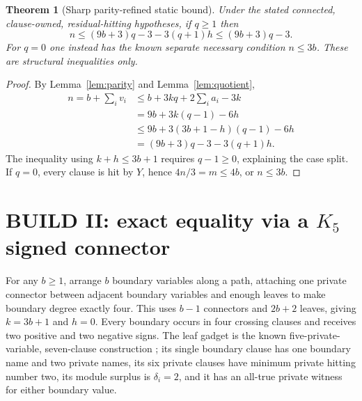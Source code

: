 \documentclass[11pt]{article}
\newtheorem{theorem}{Theorem}
\begin{document}
\begin{theorem}[Sharp parity-refined static bound]\label{th:bound}
Under the stated connected, clause-owned, residual-hitting hypotheses, if $q\ge1$ then
\begin{equation}\label{eq:newbound}
 \boxed{n\le(9b+3)q-3-3(q+1)h\le(9b+3)q-3.}
\end{equation}
For $q=0$ one instead has the known separate necessary condition $n\le3b$. These are \emph{structural} inequalities only.
\end{theorem}
\begin{proof}
By Lemma~\ref{lem:parity} and Lemma~\ref{lem:quotient},
\begin{align*}
 n=b+\sum_i v_i&\le b+3kq+2\sum_i a_i-3k\\
 &=9b+3k(q-1)-6h\\
 &\le9b+3(3b+1-h)(q-1)-6h\\
 &=(9b+3)q-3-3(q+1)h.
\end{align*}
The inequality using $k+h\le3b+1$ requires $q-1\ge0$, explaining the case split. If $q=0$, every clause is hit by $Y$, hence $4n/3=m\le4b$, or $n\le3b$.
\end{proof}

\section{BUILD II: exact equality via a $K_5$ signed connector}
For any $b\ge1$, arrange $b$ boundary variables along a path, attaching one private connector between adjacent boundary variables and enough leaves to make boundary degree exactly four. This uses $b-1$ connectors and $2b+2$ leaves, giving $k=3b+1$ and $h=0$. Every boundary occurs in four crossing clauses and receives two positive and two negative signs. The leaf gadget is the known five-private-variable, seven-clause construction \cite{component}; its single boundary clause has one boundary name and two private names, its six private clauses have minimum private hitting number two, its module surplus is $\delta_i=2$, and it has an all-true private witness for either boundary value.
\end{document}
